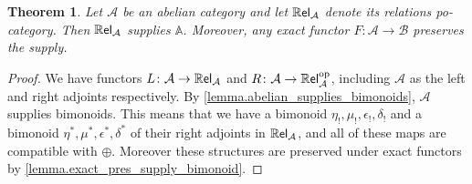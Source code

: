 \documentclass[11pt, oneside, article]{memoir}
\theoremstyle{plain}
\newtheorem{theorem}{Theorem}[chapter] %
\theoremstyle{definition}
\theoremstyle{remark}
\newcommand{\cat}[1]{\mathcal{#1}}%
\newcommand{\Cat}[1]{{\mathsf{#1}}}%
\newcommand{\CCat}[1]{\mathbb{\StrLeft{#1}{1}}\Cat{\StrGobbleLeft{#1}{1}}}%
\newcommand{\tn}[1]{\textnormal{#1}}
\newcommand{\op}{^{\tn{op}}}
\renewcommand{\aa}{\mathbb{A}} %
\newcommand{\lsh}[1]{#1_!}
\newcommand{\ust}[1]{#1^\ast}
\newcommand{\rrel}[1]{\CCat{Rel}_{#1}}
\begin{document}
\begin{theorem}\label{thm.ab_pocats_supply_ab_rels}
Let $\cat{A}$ be an abelian category and let $\rrel{\cat{A}}$ denote its relations po-category. Then $\rrel{\cat{A}}$ supplies $\aa$. Moreover, any exact functor $F\colon\cat{A}\to\cat{B}$ preserves the supply.
\end{theorem}
\begin{proof}
We have functors $L\colon\cat{A}\to\rrel{\cat{A}}$ and $R\colon\cat{A}\to\rrel{\cat{A}}\op$, including $\cat{A}$ as the left and right adjoints respectively. By \cref{lemma.abelian_supplies_bimonoids}, $\cat{A}$ supplies bimonoids. This means that we have a bimonoid $\lsh{\eta},\lsh{\mu},\lsh{\epsilon},\lsh{\delta}$ and a bimonoid $\ust{\eta},\ust{\mu},\ust{\epsilon},\ust{\delta}$ of their right adjoints in $\rrel{\cat{A}}$, and all of these maps are compatible with $\oplus$. Moreover these structures are preserved under exact functors by \cref{lemma.exact_pres_supply_bimonoid}. 


\end{proof}
\end{document}

